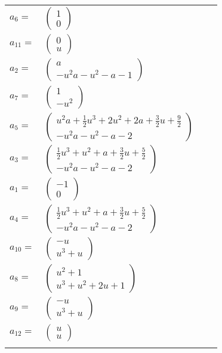 \documentclass[1p]{elsarticle_modified}
\theoremstyle{definition}
\begin{document}
\begin{tabular}{m{7pt} m{180pt} m{7pt} m{180pt} }
\flushright $a_{6}=$&$\begin{pmatrix}1\\0\end{pmatrix}$ \\
\flushright $a_{11}=$&$\begin{pmatrix}0\\u\end{pmatrix}$ \\
\flushright $a_{2}=$&$\begin{pmatrix}a\\- u^2 a- u^2- a-1\end{pmatrix}$ \\
\flushright $a_{7}=$&$\begin{pmatrix}1\\- u^2\end{pmatrix}$ \\
\flushright $a_{5}=$&$\begin{pmatrix}u^2 a+\frac{1}{2} u^3+2 u^2+2 a+\frac{3}{2} u+\frac{9}{2}\\- u^2 a- u^2- a-2\end{pmatrix}$ \\
\flushright $a_{3}=$&$\begin{pmatrix}\frac{1}{2} u^3+u^2+a+\frac{3}{2} u+\frac{5}{2}\\- u^2 a- u^2- a-2\end{pmatrix}$ \\
\flushright $a_{1}=$&$\begin{pmatrix}-1\\0\end{pmatrix}$ \\
\flushright $a_{4}=$&$\begin{pmatrix}\frac{1}{2} u^3+u^2+a+\frac{3}{2} u+\frac{5}{2}\\- u^2 a- u^2- a-2\end{pmatrix}$ \\
\flushright $a_{10}=$&$\begin{pmatrix}- u\\u^3+u\end{pmatrix}$ \\
\flushright $a_{8}=$&$\begin{pmatrix}u^2+1\\u^3+u^2+2 u+1\end{pmatrix}$ \\
\flushright $a_{9}=$&$\begin{pmatrix}- u\\u^3+u\end{pmatrix}$ \\
\flushright $a_{12}=$&$\begin{pmatrix}u\\u\end{pmatrix}$\\&\end{tabular}
\end{document}
